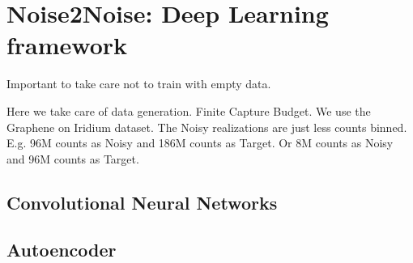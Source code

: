 \section{Noise2Noise: Deep Learning framework}
Important to take care not to train with empty data. 

Here we take care of data generation. Finite Capture Budget. We use the Graphene on Iridium dataset. The Noisy realizations are just less counts binned. 
E.g. 96M counts as Noisy and 186M counts as Target. Or 8M counts as Noisy and 96M counts as Target.
\subsection{Convolutional Neural Networks}
\subsection{Autoencoder}